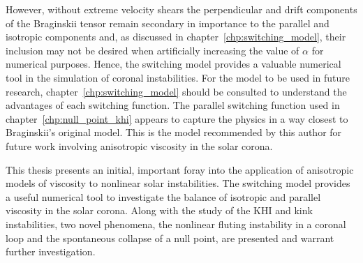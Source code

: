 However, without extreme velocity shears the perpendicular and drift components of the Braginskii tensor remain secondary in importance to the parallel and isotropic components and, as discussed in chapter~\ref{chp:switching_model}, their inclusion may not be desired when artificially increasing the value of $\alpha$ for numerical purposes. Hence, the switching model provides a valuable numerical tool in the simulation of coronal instabilities. For the model to be used in future research, chapter~\ref{chp:switching_model} should be consulted to understand the advantages of each switching function. The parallel switching function used in chapter~\ref{chp:null_point_khi} appears to capture the physics in a way closest to Braginskii's original model. This is the model recommended by this author for future work involving anisotropic viscosity in the solar corona.

This thesis presents an initial, important foray into the application of anisotropic models of viscosity to nonlinear solar instabilities. The switching model provides a useful numerical tool to investigate the balance of isotropic and parallel viscosity in the solar corona. Along with the study of the KHI and kink instabilities, two novel phenomena, the nonlinear fluting instability in a coronal loop and the spontaneous collapse of a null point, are presented and warrant further investigation.
